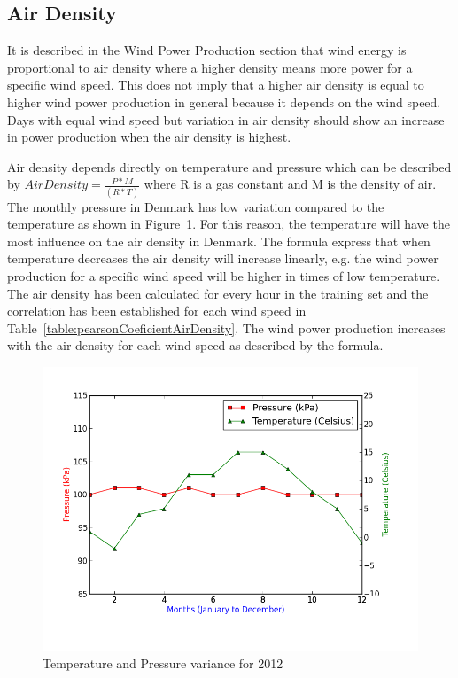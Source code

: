 \subsection{Air Density}
It is described in the Wind Power Production section that wind energy is proportional to air density where a higher density means more power for a specific wind speed. This does not imply that a higher air density is equal to higher wind power production in general because it depends on the wind speed. Days with equal wind speed but variation in air density should show an increase in power production when the air density is highest. 

Air density depends directly on temperature and pressure which can be described by $Air Density=\frac{P*M}{(R*T)}$ where R is a gas constant and M is the density of air. The monthly pressure in Denmark has low variation compared to the temperature as shown in Figure~\ref{fig:pressureTemperatureVariance}. For this reason, the temperature will have the most influence on the air density in Denmark. The formula express that when temperature decreases the air density will increase linearly, e.g. the wind power production for a specific wind speed will be higher in times of low temperature. The air density has been calculated for every hour in the training set and the correlation has been established for each wind speed in Table~\ref{table:pearsonCoeficientAirDensity}. The wind power production increases with the air density for each wind speed as described by the formula.

\begin{figure}[H]
\centering
\includegraphics[width=0.99\linewidth,natwidth=898,natheight=587]{billeder/pressureTemperatureVariance.png}
\caption{Temperature and Pressure variance for 2012}
\label{fig:pressureTemperatureVariance}
\end{figure}

